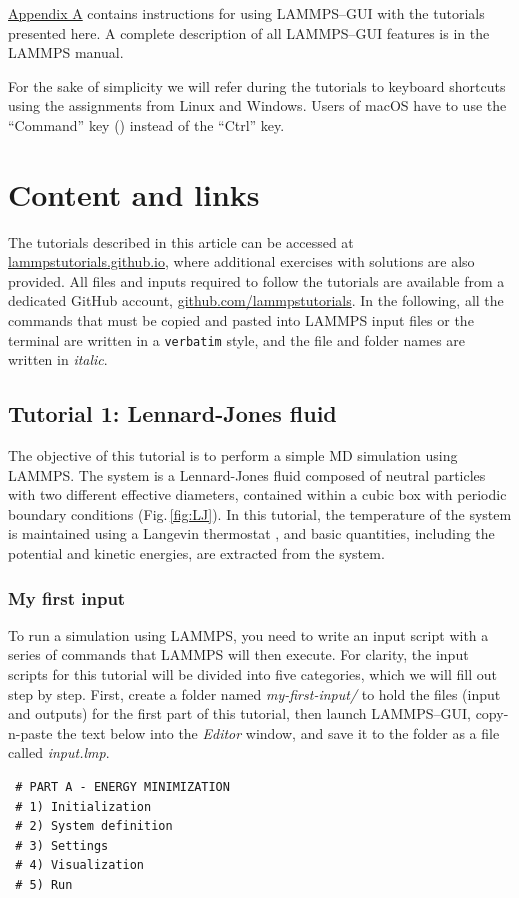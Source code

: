 \documentclass[9pt,tutorial]{livecoms}
\begin{document}
\hyperref[using-lammps-gui]{Appendix A} contains instructions for using
LAMMPS--GUI with the tutorials presented here.  A complete description
of all LAMMPS--GUI features is in the LAMMPS manual\cite{lammps_gui_docs}.

\begin{note}
  For the sake of simplicity we will refer during the tutorials to
  keyboard shortcuts using the assignments from Linux and Windows. Users
  of macOS have to use the ``Command'' key (\cmd) instead of the
  ``Ctrl'' key.
\end{note}

\section{Content and links}

The tutorials described in this article can be accessed at
\href{https://lammpstutorials.github.io}{lammpstutorials.github.io},
where additional exercises with solutions are also provided. All files
and inputs required to follow the tutorials are available from a
dedicated GitHub account,
\href{https://github.com/lammpstutorials}{github.com/lammpstutorials}. In
the following, all the commands that must be copied and pasted into
LAMMPS input files or the terminal are written in a \verb+verbatim+
style, and the file and folder names are written in \textit{italic}.

\subsection{Tutorial 1: Lennard-Jones fluid}
\label{lennard-jones-label}

The objective of this tutorial is to perform a simple MD simulation
using LAMMPS.  The system is a Lennard-Jones fluid composed of neutral
particles with two different effective diameters, contained within a
cubic box with periodic boundary conditions (Fig.\,\ref{fig:LJ}).  In
this tutorial, the temperature of the system is maintained using a
Langevin thermostat \cite{schneider1978molecular}, and basic quantities,
including the potential and kinetic energies, are extracted from the
system.

\subsubsection{My first input}

To run a simulation using LAMMPS, you need to write an input script with
a series of commands that LAMMPS will then execute.  For clarity, the
input scripts for this tutorial will be divided into five categories,
which we will fill out step by step.  First, create a folder named
\textit{my-first-input/} to hold the files (input and outputs) for the
first part of this tutorial, then launch LAMMPS--GUI, copy-n-paste the
text below into the \textit{Editor} window, and save it to the folder as
a file called \textit{input.lmp}.
{\normalsize
\begin{verbatim}
 # PART A - ENERGY MINIMIZATION
 # 1) Initialization
 # 2) System definition
 # 3) Settings
 # 4) Visualization
 # 5) Run
\end{verbatim}
}
\end{document}
